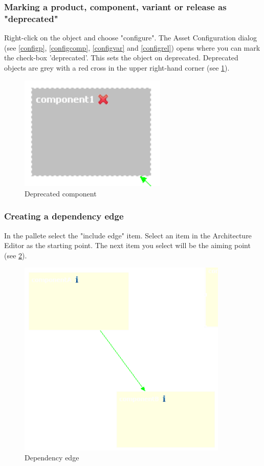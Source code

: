 \subsubsection{Marking a product, component, variant or release as "deprecated"}
Right-click on the object and choose "configure". The Asset Configuration dialog (see \ref{configp}, \ref{configcomp}, \ref{configvar} and \ref{configrel}) opens where you can
mark the check-box 'deprecated'. This sets the object on deprecated. Deprecated objects are grey with a 
red cross in the upper right-hand corner (see \ref{deprecated}).

\begin{figure}[h!]
\begin{center}
\includegraphics[width=7cm]{deprecated.png}
   \caption{Deprecated component}
\label{deprecated}
\end{center}
\end{figure}\par



\subsubsection{Creating a dependency edge}

In the pallete select the "include edge" item. Select an item in the Architecture Editor
as the starting point. The next item you select will be the aiming point (see \ref{include}).

\begin{figure}[h!]
\begin{center}
\includegraphics[width=10cm]{include.png}
   \caption{Dependency edge}
\label{include}
\end{center}
\end{figure}\par

